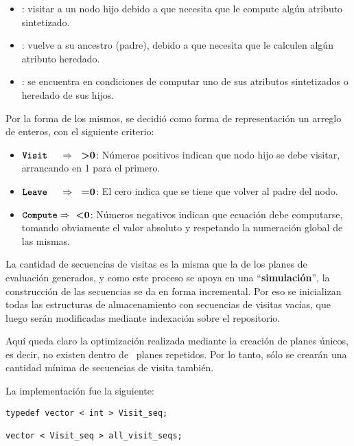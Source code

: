 \begin{itemize}
\item {}: visitar a un nodo hijo debido a que necesita que le compute algún atributo sintetizado.
\item {}: vuelve a su ancestro (padre), debido a que necesita que le calculen algún atributo heredado.
\item {}: se encuentra en condiciones de computar uno de sus atributos sintetizados o heredado de sus hijos.
\end{itemize}

Por la forma de los mismos, se decidió como forma de representación un arreglo de enteros, con el siguiente criterio:

\begin{itemize}
\item $\textbtt{Visit}\ \ \ \  \Rightarrow \ \ \textbf{>0}$: Números positivos indican que nodo hijo se debe visitar, arrancando en 1 para el primero.
\item $\textbtt{Leave}\ \ \ \  \Rightarrow \ \ \textbf{=0}$: El cero indica que se tiene que volver al padre del nodo.
\item $\textbtt{Compute} \Rightarrow \ \textbf{<0}$: Números negativos indican que ecuación debe computarse, tomando obviamente el valor absoluto y respetando la numeración global de las mismas.
\end{itemize}

La cantidad de secuencias de visitas es la misma que la de los planes de evaluación generados, y como este proceso se apoya en una ``\textbf{simulación}'', la construcción de las secuencias se da en forma incremental. Por eso se inicializan todas las estructuras de almacenamiento con secuencias de visitas vacías, que luego serán modificadas mediante indexación sobre el repositorio.

Aquí queda claro la optimización realizada mediante la creación de planes únicos, es decir, no existen dentro de \maggen\ planes repetidos. Por lo tanto, sólo se crearán una cantidad mínima de secuencias de visita también. 


La implementación fue la siguiente:

\begin{lstlisting}[columns=fullflexible, linewidth=7cm]
typedef vector < int > Visit_seq;

vector < Visit_seq > all_visit_seqs;
\end{lstlisting}

